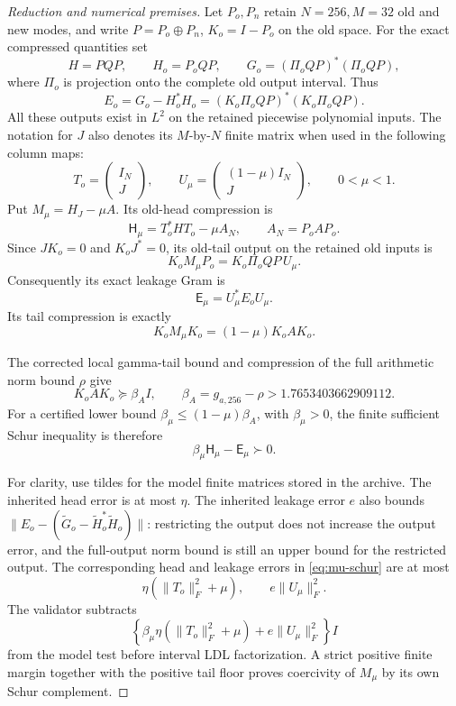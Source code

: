 \documentclass[11pt]{article}
\theoremstyle{remark}\newtheorem{remark}[theorem]{Remark}
\begin{document}
\begin{proof}[Reduction and numerical premises]
Let \(P_o,P_n\) retain \(N=256,M=32\) old and new modes,
and write \(P=P_o\oplus P_n\), \(K_o=I-P_o\) on the old space.
For the exact compressed quantities set
\[
 H=PQP,\qquad H_o=P_oQP,\qquad
 G_o=(\Pi_o QP)^*(\Pi_o QP),
\]
where \(\Pi_o\) is projection onto the complete old output interval.
Thus
\[
 E_o=G_o-H_o^*H_o=(K_o\Pi_o QP)^*(K_o\Pi_o QP).
\]
All these outputs exist in \(L^2\) on the retained piecewise polynomial inputs.
The notation for \(J\) also denotes its \(M\)-by-\(N\) finite matrix when used
in the following column maps:
\[
 T_o=\begin{pmatrix}I_N\\J\end{pmatrix},\qquad
 U_\mu=\begin{pmatrix}(1-\mu)I_N\\J\end{pmatrix},\qquad 0<\mu<1.
\]
Put \(M_\mu=H_J-\mu A\). Its old-head compression is
\[
 \mathsf H_\mu=T_o^*HT_o-\mu A_N,
 \qquad A_N=P_oAP_o.
\]
Since \(J K_o=0\) and \(K_oJ^*=0\), its old-tail output on the retained
old inputs is
\[
 K_oM_\mu P_o=K_o\Pi_o QP\,U_\mu.
\]
Consequently its exact leakage Gram is
\begin{equation}\label{eq:mu-leakage}
 \mathsf E_\mu=U_\mu^*E_oU_\mu.
\end{equation}
Its tail compression is exactly
\[
 K_oM_\mu K_o=(1-\mu)K_oAK_o.
\]

The corrected local gamma-tail bound and compression of the full arithmetic
norm bound \(\rho\) give
\[
 K_oAK_o\succeq\beta_A I,
 \qquad \beta_A=g_{a,256}-\rho>1.7653403662909112.
\]
For a certified lower bound \(\beta_\mu\le(1-\mu)\beta_A\), with
\(\beta_\mu>0\), the finite sufficient Schur inequality is therefore
\begin{equation}\label{eq:mu-schur}
 \beta_\mu\mathsf H_\mu-\mathsf E_\mu\succ0.
\end{equation}

For clarity, use tildes for the model finite matrices stored in the archive.
The inherited head error is at most \(\eta\). The inherited leakage error
\(e\) also bounds
\(\|E_o-(\widetilde G_o-\widetilde H_o^*\widetilde H_o)\|\):
restricting the output does not increase the output error, and the full-output
norm bound is still an upper bound for the restricted output. The corresponding
head and leakage errors in \eqref{eq:mu-schur} are at most
\[
 \eta(\|T_o\|_F^2+\mu),\qquad e\|U_\mu\|_F^2.
\]
The validator subtracts
\begin{equation}\label{eq:mu-budget}
 \left\{\beta_\mu\eta(\|T_o\|_F^2+\mu)
             +e\|U_\mu\|_F^2\right\}I
\end{equation}
from the model test before interval LDL factorization. A strict positive
finite margin together with the positive tail floor proves coercivity of
\(M_\mu\) by its own Schur complement.


\end{proof}
\end{document}
